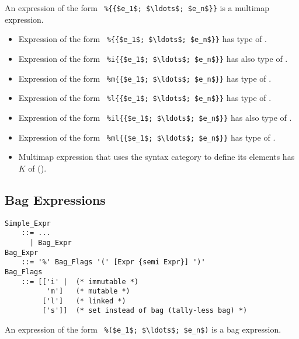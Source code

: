 An expression of the form ~\lstinline!%{{$e_1$; $\ldots$; $e_n$}}! is a multimap expression. 

\begin{itemize}
  \item Expression of the form ~\lstinline!%{{$e_1$; $\ldots$; $e_n$}}!
    has type of . 
  \item Expression of the form ~\lstinline!%i{{$e_1$; $\ldots$; $e_n$}}!
    has also type of . 
  \item Expression of the form ~\lstinline!%m{{$e_1$; $\ldots$; $e_n$}}!
    has type of .
  \item Expression of the form ~\lstinline!%l{{$e_1$; $\ldots$; $e_n$}}!
    has type of . 
  \item Expression of the form ~\lstinline!%il{{$e_1$; $\ldots$; $e_n$}}!
    has also type of . 
  \item Expression of the form ~\lstinline!%ml{{$e_1$; $\ldots$; $e_n$}}!
    has type of .
  \item Multimap expression that uses the  syntax category to define its elements has $K$ of  (). 
\end{itemize}






\subsection{Bag Expressions}
\label{sec:bag-expressions}

\grammar\begin{lstlisting}
Simple_Expr 
    ::= ...
      | Bag_Expr
Bag_Expr
    ::= '%' Bag_Flags '(' [Expr {semi Expr}] ')'
Bag_Flags
    ::= [['i' |  (* immutable *)
          'm']   (* mutable *)
         ['l']   (* linked *)
         ['s']]  (* set instead of bag (tally-less bag) *)
\end{lstlisting}

An expression of the form ~\lstinline!%($e_1$; $\ldots$; $e_n$)! is a bag expression. 

